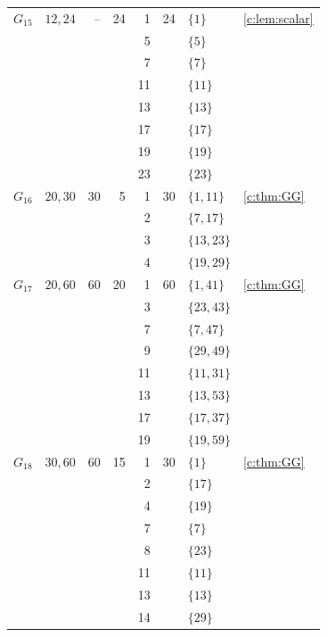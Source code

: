 \documentclass[10pt,a4paper]{amsart}
\theoremstyle{definition}
\begin{document}
\begin{longtable}{@{}lL{.24\textwidth}rrrrL{.26\textwidth}L{.14\textwidth}@{}}
$G_{15}$ & $12,\allowbreak 24$ & -- & 24 & 1 & 24 & $\{1\}$ & \cref{c:lem:scalar} \\*
 &  &  &  & 5 &  & $\{5\}$ &  \\*
 &  &  &  & 7 &  & $\{7\}$ &  \\*
 &  &  &  & 11 &  & $\{11\}$ &  \\*
 &  &  &  & 13 &  & $\{13\}$ &  \\*
 &  &  &  & 17 &  & $\{17\}$ &  \\*
 &  &  &  & 19 &  & $\{19\}$ &  \\*
 &  &  &  & 23 &  & $\{23\}$ &  \\
\midrule[.25pt]
$G_{16}$ & $20,\allowbreak 30$ & 30 & 5 & 1 & 30 & $\{1,\allowbreak 11\}$ & \cref{c:thm:GG} \\*
 &  &  &  & 2 &  & $\{7,\allowbreak 17\}$ &  \\*
 &  &  &  & 3 &  & $\{13,\allowbreak 23\}$ &  \\*
 &  &  &  & 4 &  & $\{19,\allowbreak 29\}$ &  \\
\midrule[.25pt]
$G_{17}$ & $20,\allowbreak 60$ & 60 & 20 & 1 & 60 & $\{1,\allowbreak 41\}$ & \cref{c:thm:GG} \\*
 &  &  &  & 3 &  & $\{23,\allowbreak 43\}$ &  \\*
 &  &  &  & 7 &  & $\{7,\allowbreak 47\}$ &  \\*
 &  &  &  & 9 &  & $\{29,\allowbreak 49\}$ &  \\*
 &  &  &  & 11 &  & $\{11,\allowbreak 31\}$ &  \\*
 &  &  &  & 13 &  & $\{13,\allowbreak 53\}$ &  \\*
 &  &  &  & 17 &  & $\{17,\allowbreak 37\}$ &  \\*
 &  &  &  & 19 &  & $\{19,\allowbreak 59\}$ &  \\
\midrule[.25pt]
$G_{18}$ & $30,\allowbreak 60$ & 60 & 15 & 1 & 30 & $\{1\}$ & \cref{c:thm:GG} \\*
 &  &  &  & 2 &  & $\{17\}$ &  \\*
 &  &  &  & 4 &  & $\{19\}$ &  \\*
 &  &  &  & 7 &  & $\{7\}$ &  \\*
 &  &  &  & 8 &  & $\{23\}$ &  \\*
 &  &  &  & 11 &  & $\{11\}$ &  \\*
 &  &  &  & 13 &  & $\{13\}$ &  \\*
 &  &  &  & 14 &  & $\{29\}$ &  \\

\end{longtable}
\end{document}
